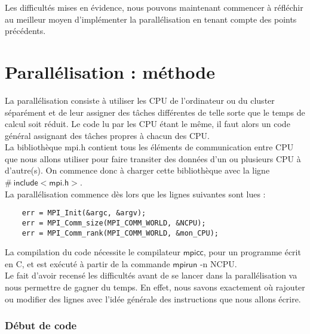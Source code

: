 \documentclass[french]{article}
\newcommand{\navy}{\color{navy}}
\newcommand{\choco}{\color{choco}}
\newcommand{\bk}{\color{black}}
\begin{document}
Les difficultés mises en évidence, nous pouvons maintenant commencer à réfléchir au meilleur moyen d'implémenter la parallélisation en tenant compte des points précédents.
\navy \section{Parallélisation : méthode}  \bk \thispagestyle{fancy}
La parallélisation consiste à utiliser les CPU de l'ordinateur ou du cluster séparément et de leur assigner des tâches différentes de telle sorte que le temps de calcul soit réduit. Le code lu par les CPU étant le même, il faut alors un code général assignant des tâches propres à chacun des CPU. \\
La bibliothèque mpi.h contient tous les éléments de communication entre CPU que nous allons utiliser pour faire transiter des données d'un ou plusieurs CPU à d'autre(s). On commence donc à charger cette bibliothèque avec la ligne $\mathsf{\text{\#} \ include <mpi.h>}$. \\
La parallélisation commence dès lors que les lignes suivantes sont lues :

\begin{minipage}{455 pt}
\centering
\begin{lstlisting}
    err = MPI_Init(&argc, &argv);
    err = MPI_Comm_size(MPI_COMM_WORLD, &NCPU);
    err = MPI_Comm_rank(MPI_COMM_WORLD, &mon_CPU);
\end{lstlisting}
\end{minipage}

\noindent La compilation du code nécessite le compilateur $\mathsf{mpicc}$, pour un programme  écrit en C, et est exécuté à partir de la commande $\mathsf{mpirun }$ -n \textsc{NCPU}.\\
Le fait d'avoir recensé les difficultés avant de se lancer dans la parallélisation va nous permettre de gagner du temps. En effet, nous savons exactement où rajouter ou modifier des lignes avec l'idée générale des instructions que nous allons écrire.\\

\choco \subsubsection*{Début de code } \bk 
\end{document}
